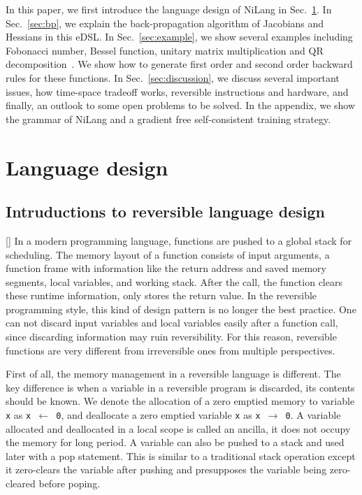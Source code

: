 \documentclass[aps,twocolumn,longbibliography,english,superscriptaddress]{revtex4-1}
\newcommand{\<}{\langle}
\renewcommand{\>}{\rangle}
\newcommand{\Sec}[1]{Sec.~\ref{#1}}
\newcommand{\violet}[1]{[{\bf  \color{violet}{MLS: #1}}]}
\theoremstyle{definition}\newtheorem{definition}{\textit{Definition}}
\begin{document}
    In this paper, we first introduce the language design of NiLang in \Sec{sec:lang}.
    In \Sec{sec:bp}, we explain the back-propagation algorithm of Jacobians and Hessians in this eDSL.
    In \Sec{sec:example}, we show several examples including Fobonacci number, Bessel function, unitary matrix multiplication and QR decomposition~\cite{Golub2012}. We show how to generate first order and second order backward rules for these functions.
    In \Sec{sec:discussion}, we discuss several important issues, how time-space tradeoff works, reversible instructions and hardware, and finally, an outlook to some open problems to be solved.
    In the appendix, we show the grammar of NiLang and a gradient free self-consistent training strategy.

\section{Language design}\label{sec:lang}

\subsection{Intruductions to reversible language design}
    \violet{Add more introduction to reversible programming}
    In a modern programming language, functions are pushed to a global stack for scheduling. The memory layout of a function consists of input arguments, a function frame with information like the return address and saved memory segments, local variables, and working stack. After the call, the function clears these runtime information, only stores the return value. In the reversible programming style, this kind of design pattern is no longer the best practice. One can not discard input variables and local variables easily after a function call, since discarding information may ruin reversibility. For this reason, reversible functions are very different from irreversible ones from multiple perspectives.

    First of all, the memory management in a reversible language is different.
    The key difference is when a variable in a reversible program is discarded, its contents should be known.
    We denote the allocation of a zero emptied memory to variable \texttt{x} as \texttt{x $\leftarrow$ 0}, and deallocate a zero emptied variable \texttt{x} as \texttt{x $\rightarrow$ 0}.
    A variable allocated and deallocated in a local scope is called an ancilla, it does not occupy the memory for long period.
    A variable can also be pushed to a stack and used later with a pop statement. This is similar to a traditional stack operation except it zero-clears the variable after pushing and presupposes the variable being zero-cleared before poping.
\end{document}
